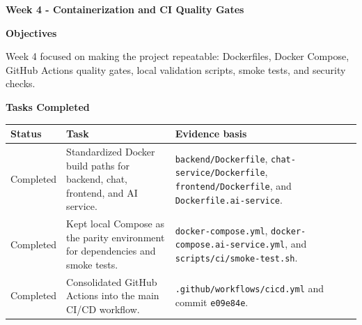\vspace{0.5em}\noindent\textbf{Week 4 - Containerization and CI Quality
Gates}\par

\vspace{0.5em}\noindent\textbf{Objectives}\par

Week 4 focused on making the project repeatable: Dockerfiles, Docker
Compose, GitHub Actions quality gates, local validation scripts, smoke
tests, and security checks.

\vspace{0.5em}\noindent\textbf{Tasks Completed}\par

{
\begingroup
\small
\setlength{\tabcolsep}{3pt}
\renewcommand{\arraystretch}{1.15}
\begin{longtable}{@{}
  >{\raggedright\arraybackslash}p{}
  >{\raggedright\arraybackslash}p{}
  >{\raggedright\arraybackslash}p{}@{}}
\toprule\noalign{}
\begin{minipage}[b]{\linewidth}\raggedright
Status
\end{minipage} & \begin{minipage}[b]{\linewidth}\raggedright
Task
\end{minipage} & \begin{minipage}[b]{\linewidth}\raggedright
Evidence basis
\end{minipage} \\
\midrule\noalign{}
\endhead
\bottomrule\noalign{}
\endlastfoot
Completed & Standardized Docker build paths for backend, chat, frontend,
and AI service. & \texttt{backend/\allowbreak{}Dockerfile},
\texttt{chat-\allowbreak{}service/\allowbreak{}Dockerfile}, \texttt{frontend/\allowbreak{}Dockerfile}, and
\texttt{Dockerfile.\allowbreak{}ai-\allowbreak{}service}. \\
Completed & Kept local Compose as the parity environment for
dependencies and smoke tests. & \texttt{docker-\allowbreak{}compose.\allowbreak{}yml},
\texttt{docker-\allowbreak{}compose.\allowbreak{}ai-\allowbreak{}service.\allowbreak{}yml}, and
\texttt{scripts/\allowbreak{}ci/\allowbreak{}smoke-\allowbreak{}test.\allowbreak{}sh}. \\
Completed & Consolidated GitHub Actions into the main CI/CD workflow. &
\texttt{.\allowbreak{}github/\allowbreak{}workflows/\allowbreak{}cicd.\allowbreak{}yml} and commit \texttt{e09e84e}. \\

\end{longtable}}
